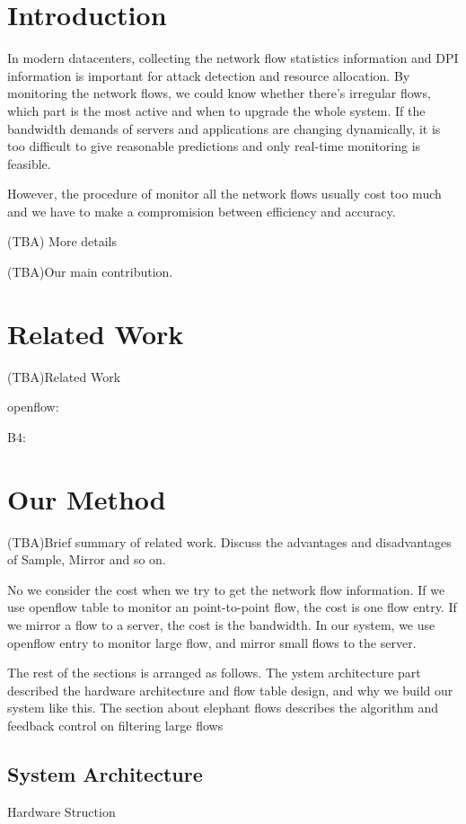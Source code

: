 \documentclass{acm_proc_article-sp}
\begin{document}


\section{Introduction}
In modern datacenters, collecting the network flow statistics information and DPI information is important for attack detection and resource allocation. By monitoring the network flows, we could know whether there's irregular flows, which part is the most active and when to upgrade the whole system. If the bandwidth demands of servers and applications are changing dynamically, it is too difficult to give reasonable predictions and only real-time monitoring is feasible.

However, the procedure of monitor all the network flows usually cost too much and we have to make a compromision between efficiency and accuracy. 

(TBA) More details

(TBA)Our main contribution.


\section{Related Work}
(TBA)Related Work

openflow: \cite{openflow}

B4: \cite{google-b4} 

\section{Our Method}
(TBA)Brief summary of related work. Discuss the advantages and disadvantages of Sample, Mirror and so on.

No we consider the cost when we try to get the network flow information. If we use openflow table to monitor an point-to-point flow, the cost is one flow entry. If we mirror a flow to a server, the cost is the bandwidth. In our system, we use openflow entry to monitor large flow, and mirror small flows to the server.

The rest of the sections is arranged as follows. The ystem architecture part described the hardware architecture and flow table design, and why we build our system like this.  The section about elephant flows describes the algorithm and feedback control on filtering large flows

\subsection{System Architecture}
Hardware Struction
\end{document}
